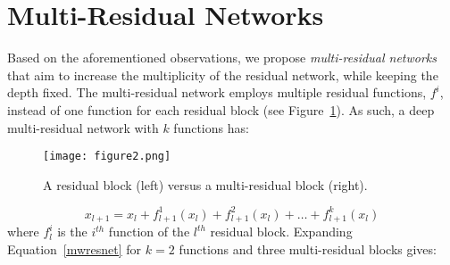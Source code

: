 \documentclass[journal]{IEEEtran}
\begin{document}
\section{Multi-Residual Networks}\label{sec4}

Based on the aforementioned observations, we propose \textit{multi-residual networks} that aim to increase the multiplicity of the residual network, while keeping the depth fixed. The multi-residual network employs multiple residual functions, $f^i$, instead of one function for each residual block (see Figure~\ref{fig:resblock}). As such, a deep multi-residual network with $k$ functions has:


\begin{figure}
\centering
\texttt{[image: figure2.png]}
\caption{A residual block (left) versus a multi-residual block (right).}
\label{fig:resblock}
\end{figure}

\begin{equation}\label{mwresnet}
x_{l+1} = x_l+ f_{l+1}^1(x_l) + f_{l+1}^2 (x_l) + \dots + f_{l+1}^k(x_l)
\end{equation}
where $f^i_l$ is the $i^{th}$ function of the $l^{th}$ residual block. Expanding Equation~\ref{mwresnet} for $k=2$ functions and three multi-residual blocks gives:
\end{document}

